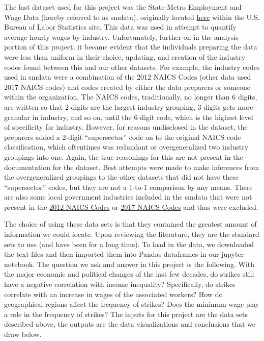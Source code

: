 \documentclass[reqno,11pt]{amsart}
\begin{document}
The last dataset used for this project was the State-Metro Employment and Wage Data (hereby referred to as smdata), 
originally located 
\href{https://download.bls.gov/pub/time.series/sm/sm.data.1.AllData}{here}
within the U.S. Bureau of Labor Statistics site. This data was used in attempt to quantify average hourly wages by 
industry. Unfortunately, further on in the analysis portion of this project, it became evident that the individuals 
preparing the data were less than uniform in their choice, updating, and creation of the industry codes found between 
this and our other datasets. For example, the industry codes used in smdata were a combination of the 2012 NAICS Codes 
(other data used 2017 NAICS codes) and codes created by either the data preparers or someone within the organization. 
The NAICS codes, traditionally, no longer than 6 digits, are written so that 2 digits are the largest industry grouping, 
3 digits gets more granular in industry, and so on, until the 6-digit code, which is the highest level of specificity for 
industry. However, for reasons undisclosed in the dataset, the preparers added a 2-digit ``supersector'' code on to the 
original NAICS code classification, which oftentimes was redundant or overgeneralized two industry groupings into one. 
Again, the true reasonings for this are not present in the documentation for the dataset. Best attempts were made to make 
inferences from the overgeneralized groupings to the other datasets that did not have these ``supersector'' codes, but they
 are not a 1-to-1 comparison by any means. There are also some local government industries included in the smdata that 
 were not present in the 
\href{https://www.census.gov/naics/?58967?yearbck=2012}{2012 NAICS Codes} or 
\href{https://www.census.gov/naics/?58967?yearbck=2017}{2017 NAICS Codes}
 and thus were excluded. 




The choice of using these data sets is that they contained the greatest
amount of information we could locate. Upon reviewing the literature,
they are the standard sets to use (and have been for a long time).
To load in the data, we downloaded the text files and then imported them
into Pandas dataframes in our jupyter notebook. The question we ask and
answer in this project is the following. With the major economic and political
changes of the last few decades, do strikes still have a negative correlation
with income inequality? Specifically, do strikes correlate with an increase
in wages of the associated workers? How do geographical regions affect
the frequency of strikes? Does the minimum wage play a role in the frequency
of strikes? The inputs for this project are the
data sets described above, the outputs are the data visualizations and 
conclusions that we draw below.
\end{document}
